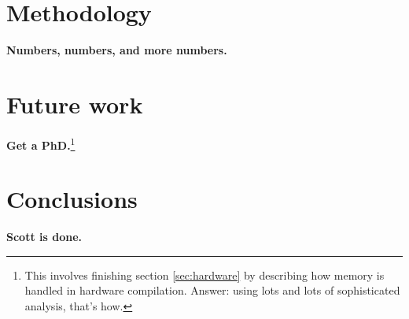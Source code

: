 \documentclass[12pt,titlepage,twoside]{article}
\let\oldsection\section
\renewcommand{\section}{\setcounter{figure}{0}\setcounter{table}{0}\oldsection}
\begin{document}
\section{Methodology}\label{sec:methodology}
\textbf{Numbers, numbers, and more numbers.}

\section{Future work}
\textbf{Get a PhD.}\footnote{This involves finishing section
\ref{sec:hardware} by describing how memory is handled in hardware
compilation.  Answer: using lots and lots of sophisticated analysis,
that's how.}

\section{Conclusions}
\textbf{Scott is done.}
\end{document}
